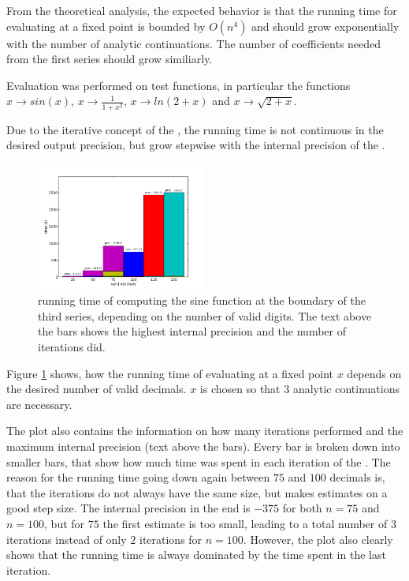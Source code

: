 		From the theoretical analysis, the expected behavior is that the running time for evaluating at a fixed 
		point is bounded by $O(n^4)$ and should grow exponentially with the number of analytic continuations.
		The number of coefficients needed from the first series should grow similiarly. 

 		Evaluation was performed on test functions, in particular the functions $x \to sin(x)$, $x \to \frac{1}{1+x^2}$, $x \to ln(2+x)$ and $x \to \sqrt{2+x}$. 

 		Due to the iterative concept of the \irram, the running time is not continuous in the desired output precision, but grow stepwise with the internal precision of the \irram.

		\begin{figure}[H]
			\centering
			\includegraphics[width=0.5\textwidth]{img/analytic/sin_for_series_4_dep_on_n.png}
			\caption{running time of \anarect computing the sine function at the boundary of the third series, depending on the number of valid digits. The text above the bars shows the highest internal precision and the number of iterations \irram did.}
			\label{fig:sin dep on n}
		\end{figure}

		Figure \ref{fig:sin dep on n} shows, how the running time of evaluating at a fixed point $x$ depends on the desired number of valid decimals. 
		$x$ is chosen so that $3$ analytic continuations are necessary. 

		The plot also contains the information on how many iterations \irram performed and the maximum internal 
		precision (text above the bars). 
		Every bar is broken down into smaller bars, that show how much time was spent in each iteration of the \irram.
		The reason for the running time going down again between $75$ and $100$ decimals is, that
		the iterations do not always have the same size, but \irram makes estimates on a good step size.
		The internal precision in the end is $-375$ for both $n=75$ and $n=100$, but 
		for $75$ the first estimate is too small, leading to a total number of $3$ iterations instead of only $2$ iterations for $n=100$.
		However, the plot also clearly shows that the running time is always dominated by the time spent in the last iteration.

